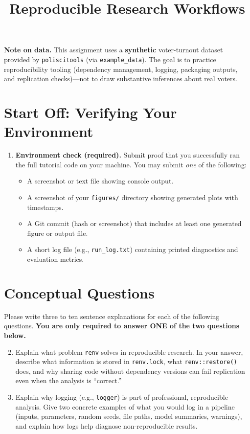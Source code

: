 \documentclass[11pt]{article}
\title{ Reproducible Research Workflows}
\author{ }
\date{ }
\begin{document}
\maketitle

\noindent \textbf{Note on data.} This assignment uses a \textbf{synthetic} voter-turnout dataset provided by \texttt{poliscitools} (via \texttt{example\_data}). The goal is to practice reproducibility tooling (dependency management, logging, packaging outputs, and replication checks)---not to draw substantive inferences about real voters.

\section*{Start Off: Verifying Your Environment}

\begin{enumerate}
\item \textbf{Environment check (required).}  
Submit proof that you successfully ran the full tutorial code on your machine. You may submit \emph{one} of the following:
\begin{itemize}
  \item A screenshot or text file showing console output.
  \item A screenshot of your \texttt{figures/} directory showing generated plots with timestamps.
  \item A Git commit (hash or screenshot) that includes at least one generated figure or output file.
  \item A short log file (e.g., \texttt{run\_log.txt}) containing printed diagnostics and evaluation metrics.
\end{itemize}
\end{enumerate}

\section*{Conceptual Questions}
Please write three to ten sentence explanations for each of the following questions. \textbf{You are only required to answer ONE of the two questions below.} \bigskip
 
\begin{enumerate}
\setcounter{enumi}{1}

\item Explain what problem \texttt{renv} solves in reproducible research. In your answer, describe what information is stored in \texttt{renv.lock}, what \texttt{renv::restore()} does, and why sharing code without dependency versions can fail replication even when the analysis is ``correct.''

\item Explain why logging (e.g., \texttt{logger}) is part of professional, reproducible analysis. Give two concrete examples of what you would log in a pipeline (inputs, parameters, random seeds, file paths, model summaries, warnings), and explain how logs help diagnose non-reproducible results.

  \end{enumerate}
\end{document}
